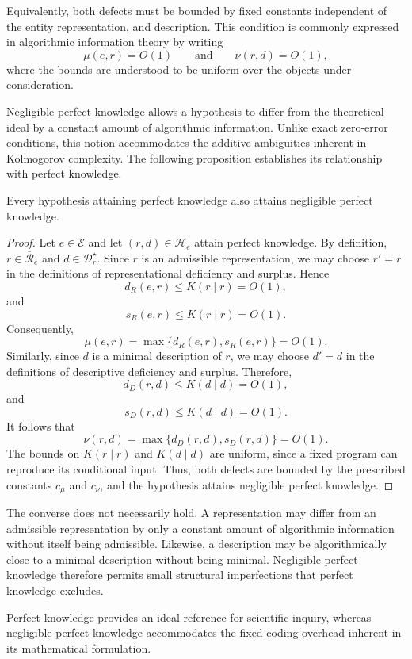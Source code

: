 Equivalently, both defects must be bounded by fixed constants independent of the entity representation, and description. This condition is commonly expressed in algorithmic information
theory by writing
\[
\mu(e,r)=O(1) \qquad\text{and}\qquad \nu(r,d)=O(1),
\]
where the bounds are understood to be uniform over the objects under consideration.

Negligible perfect knowledge allows a hypothesis to differ from the theoretical ideal by a constant amount of algorithmic information. Unlike exact zero-error conditions, this notion accommodates the additive ambiguities inherent in Kolmogorov complexity. The following proposition establishes its relationship with perfect knowledge.

\begin{proposition}
\label{prop:minimal_rep_minimal_desc_negligible_pk}
Every hypothesis attaining perfect knowledge also attains negligible perfect knowledge.
\end{proposition}
\begin{proof}
Let $e\in\mathcal{E}$ and let $(r,d)\in\mathcal{H}_e$ attain perfect knowledge. By definition, $r\in\overline{\mathcal{R}}_e$ and $d\in\mathcal{D}_r^\star$. Since $r$ is an admissible representation, we may choose $r'=r$ in the definitions of representational deficiency and surplus. Hence
\[
d_R(e,r)\leq K(r\mid r)=O(1),
\]
and
\[
s_R(e,r)\leq K(r\mid r)=O(1).
\]
Consequently,
\[
\mu(e,r) = \max\{d_R(e,r),s_R(e,r)\} = O(1).
\]
Similarly, since $d$ is a minimal description of $r$, we may choose $d'=d$ in the definitions of descriptive
deficiency and surplus. Therefore,
\[
d_D(r,d)\leq K(d\mid d)=O(1),
\]
and
\[
s_D(r,d)\leq K(d\mid d)=O(1).
\]
It follows that
\[
\nu(r,d) = \max\{d_D(r,d),s_D(r,d)\} = O(1).
\]
The bounds on $K(r\mid r)$ and $K(d\mid d)$ are uniform, since a fixed program can reproduce its conditional input. Thus, both defects are bounded by the prescribed constants $c_\mu$ and $c_\nu$, and the hypothesis attains negligible perfect knowledge.
\end{proof}

The converse does not necessarily hold. A representation may differ from an admissible representation by only a constant amount of algorithmic information without itself being admissible. Likewise, a description may be algorithmically close to a minimal description without being minimal. Negligible perfect knowledge therefore permits small structural imperfections that perfect knowledge excludes.

Perfect knowledge provides an ideal reference for scientific inquiry, whereas negligible perfect knowledge accommodates the fixed coding overhead inherent in its mathematical formulation.

